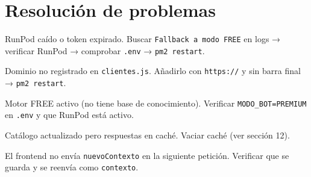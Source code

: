 \documentclass[12pt, a4paper]{article}
\begin{document}
\section{Resolución de problemas}

\begin{tcolorbox}[colback=rojoclaro!50, colframe=rojooscuro, fontupper=\small,
                  title={\bfseries El bot responde en modo FREE (respuestas genéricas)}]
RunPod caído o token expirado. Buscar \texttt{Fallback a modo FREE} en logs → verificar RunPod → comprobar \texttt{.env} → \texttt{pm2 restart}.
\end{tcolorbox}

\begin{tcolorbox}[colback=rojoclaro!50, colframe=rojooscuro, fontupper=\small,
                  title={\bfseries El chat no responde (error CORS en consola del navegador)}]
Dominio no registrado en \texttt{clientes.js}. Añadirlo con \texttt{https://} y sin barra final → \texttt{pm2 restart}.
\end{tcolorbox}

\begin{tcolorbox}[colback=rojoclaro!50, colframe=rojooscuro, fontupper=\small,
                  title={\bfseries El bot busca piezas ante preguntas comerciales}]
Motor FREE activo (no tiene base de conocimiento). Verificar \texttt{MODO\_BOT=PREMIUM} en \texttt{.env} y que RunPod está activo.
\end{tcolorbox}

\begin{tcolorbox}[colback=rojoclaro!50, colframe=rojooscuro, fontupper=\small,
                  title={\bfseries Los resultados de búsqueda están desactualizados}]
Catálogo actualizado pero respuestas en caché. Vaciar caché (ver sección 12).
\end{tcolorbox}

\begin{tcolorbox}[colback=rojoclaro!50, colframe=rojooscuro, fontupper=\small,
                  title={\bfseries El bot pide datos que el usuario ya dio}]
El frontend no envía \texttt{nuevoContexto} en la siguiente petición. Verificar que se guarda y se reenvía como \texttt{contexto}.
\end{tcolorbox}

\end{document}
